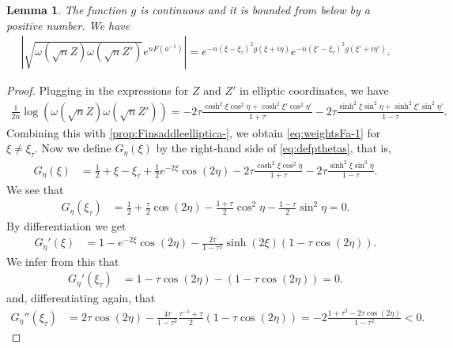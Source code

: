 \documentclass[%
 jmp,
cp,  %
 amsmath,amsthm,amssymb,%
 reprint,%
onecolumn]{revtex4-2}
\newtheorem{lemma}[theorem]{Lemma}
\begin{document}

\begin{lemma} \label{prop:weightsFa-1}
The function $g$ is continuous and it is bounded from below by a positive number.
We have
\begin{align} \label{eq:weightsFa-1}
\left|\sqrt{\omega\left(\sqrt n Z\right) \omega\left(\sqrt n Z'\right)} e^{n F(a^{-1})}\right|
= e^{- n (\xi-\xi_\tau)^2 g(\xi+i\eta)} e^{ - n (\xi'-\xi_\tau)^2 g(\xi'+i\eta')}. 
\end{align}
\end{lemma}

\begin{proof}
Plugging in the expressions for $Z$ and $Z'$ in elliptic coordinates, we have
\begin{align*}
\frac{1}{2 n} \log(\omega\left(\sqrt n Z\right) \omega\left(\sqrt n Z'\right)) 
= - 2\tau \frac{\cosh^2 \xi \cos^2 \eta + \cosh^2 \xi' \cos^2 \eta'}{1+\tau} 
- 2\tau \frac{\sinh^2 \xi \sin^2 \eta+\sinh^2 \xi' \sin^2 \eta'}{1-\tau}.
\end{align*}
Combining this with \eqref{prop:Finsaddleelliptica-}, we obtain \eqref{eq:weightsFa-1} for $\xi\neq \xi_\tau$. 
Now we define $G_\eta(\xi)$ by the right-hand side of \eqref{eq:defpthetas}, that is,
\begin{align*}
G_\eta(\xi) &= \frac{1}{2} + \xi-\xi_\tau + \frac{1}{2} e^{-2\xi} \cos(2\eta)
- 2\tau \frac{\cosh^2 \xi \cos^2 \eta}{1+\tau} 
- 2\tau \frac{\sinh^2 \xi \sin^2 \eta}{1-\tau}.
\end{align*}
We see that
\begin{align*}
G_\eta(\xi_\tau) &= 
\frac{1}{2} + \frac{\tau}{2} \cos(2\eta) - \frac{1+\tau}{2} \cos^2 \eta - \frac{1-\tau}{2} \sin^2 \eta = 0.
\end{align*}
By differentiation we get
\begin{align*}
G_\eta'(\xi) 
&= 1 - e^{-2\xi} \cos(2\eta) - \frac{2\tau}{1-\tau^2} \sinh(2\xi) (1-\tau \cos(2\eta)).
\end{align*}
We infer from this that 
\begin{align*}
G_\eta'(\xi_\tau)  &= 1 - \tau \cos(2\eta) - (1-\tau \cos(2\eta)) = 0.
\end{align*}
and, differentiating again, that
\begin{align*}
G_\eta''(\xi_\tau) &= 
2\tau \cos(2\eta) - \frac{4\tau}{1-\tau^2} \frac{\tau^{-1}+\tau}{2} (1- \tau \cos(2\eta))
= - 2 \frac{1+\tau^2- 2\tau \cos(2\eta)}{1-\tau^2} < 0.
\end{align*}

\end{proof}
\end{document}
